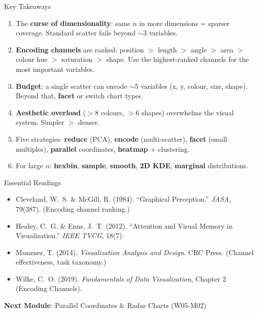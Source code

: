 \documentclass[10pt]{beamer}
\begin{document}
\begin{frame}{Key Takeaways}
  \begin{enumerate}
    \item The \textbf{curse of dimensionality}: same $n$ in more
          dimensions = sparser coverage. Standard scatter fails
          beyond $\sim$3 variables.
    \item \textbf{Encoding channels} are ranked: position $>$ length
          $>$ angle $>$ area $>$ colour hue $>$ saturation $>$ shape.
          Use the highest-ranked channels for the most important variables.
    \item \textbf{Budget}: a single scatter can encode $\sim$5 variables
          (x, y, colour, size, shape). Beyond that, \textbf{facet}
          or switch chart types.
    \item \textbf{Aesthetic overload} ($>$8 colours, $>$6 shapes)
          overwhelms the visual system. Simpler $>$ denser.
    \item Five strategies: \textbf{reduce} (PCA), \textbf{encode} (multi-scatter),
          \textbf{facet} (small multiples), \textbf{parallel} coordinates,
          \textbf{heatmap} + clustering.
    \item For large $n$: \textbf{hexbin}, \textbf{sample}, \textbf{smooth},
          \textbf{2D KDE}, \textbf{marginal} distributions.
  \end{enumerate}
\end{frame}

\begin{frame}{Essential Readings}
  \begin{itemize}
    \item Cleveland, W.~S. \& McGill, R. (1984). ``Graphical Perception.''
          \emph{JASA}, 79(387). (Encoding channel ranking.)
    \item Healey, C.~G. \& Enns, J.~T. (2012). ``Attention and Visual
          Memory in Visualization.'' \emph{IEEE TVCG}, 18(7).
    \item Munzner, T. (2014). \emph{Visualization Analysis and Design}.
          CRC Press. (Channel effectiveness, task taxonomy.)
    \item Wilke, C.~O. (2019). \emph{Fundamentals of Data Visualization},
          Chapter 2 (Encoding Channels).
  \end{itemize}
  \vspace{6pt}
  \textbf{Next Module}: Parallel Coordinates \& Radar Charts (W05-M02)
\end{frame}
\end{document}
